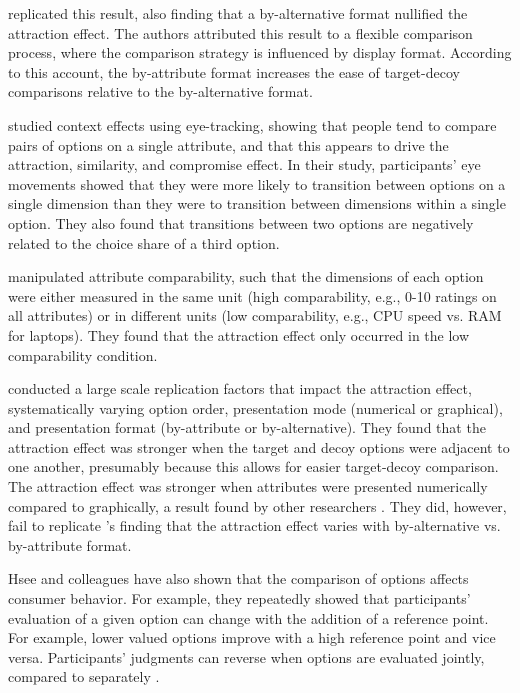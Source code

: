 \textcite{cataldoComparisonProcessAccount2019b} replicated this result, also finding that a by-alternative format nullified the attraction effect. The authors attributed this result to a flexible comparison process, where the comparison strategy is influenced by display format. According to this account, the by-attribute format increases the ease of target-decoy comparisons relative to the by-alternative format. 

\textcite{noguchi2014attraction} studied context effects using eye-tracking, showing that people tend to compare pairs of options on a single attribute, and that this appears to drive the attraction, similarity, and compromise effect. In their study, participants' eye movements showed that they were more likely to transition between options on a single dimension than they were to transition between dimensions within a single option. They also found that transitions between two options are negatively related to the choice share of a third option.

\textcite{hayes2024attribute} manipulated attribute comparability, such that the dimensions of each option were either measured in the same unit (high comparability, e.g., 0-10 ratings on all attributes) or in different units (low comparability, e.g., CPU speed vs. RAM for laptops). They found that the attraction effect only occurred in the low comparability condition. 

\textcite{hasan2025registered} conducted a large scale replication factors that impact the attraction effect, systematically varying option order, presentation mode (numerical or graphical), and presentation format (by-attribute or by-alternative). They found that the attraction effect was stronger when the target and decoy options were adjacent to one another, presumably because this allows for easier target-decoy comparison. The attraction effect was stronger when attributes were presented numerically compared to graphically, a result found by other researchers \parencite{frederickLimitsAttraction2014b,yangMoreEvidenceChallenging2014}. They did, however, fail to replicate \textcite{cataldoComparisonProcessAccount2019b}'s finding that the attraction effect varies with by-alternative vs. by-attribute format.

Hsee and colleagues \parencite{hseeEvaluabilityHypothesisExplanation1996,hseeLessBetterWhen1998,hseeWillProductsLook1998,hsee1999preference} have also shown that the comparison of options affects consumer behavior. For example, they repeatedly showed that participants’ evaluation of a given option can change with the addition of a reference point. For example, lower valued options improve with a high reference point and vice versa. Participants’ judgments can reverse when options are evaluated jointly, compared to separately \parencite{hsee1999preference}. 


